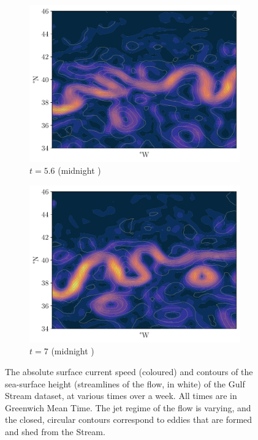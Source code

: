 \begin{figure}
\begin{center}
\begin{subfigure}{0.49\textwidth}
			\includegraphics[width=\textwidth]{chp06_applications/figures/gulf_stream_motivation/streamlines_4.pdf}
			\caption{\(t =5.6\) (midnight )}
		\end{subfigure}
		\begin{subfigure}{0.49\textwidth}
			\includegraphics[width=\textwidth]{chp06_applications/figures/gulf_stream_motivation/streamlines_5.pdf}
			\caption{\(t = 7\) (midnight )}
		\end{subfigure}

		\caption{The absolute surface current speed (coloured) and contours of the sea-surface height (streamlines of the flow, in white) of the Gulf Stream dataset, at various times over a week.
			All times are in Greenwich Mean Time.
			The jet regime of the flow is varying, and the closed, circular contours correspond to eddies that are formed and shed from the Stream.}
		\label{fig:na_motive_flow}
	\end{center}
\end{figure}


